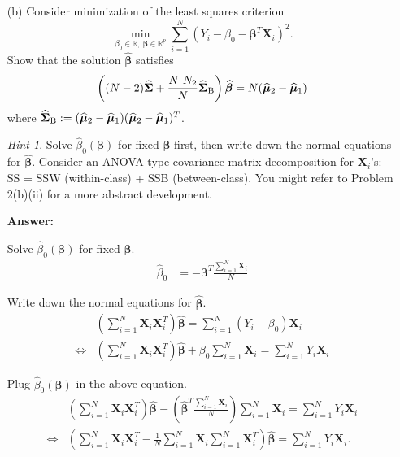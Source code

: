\documentclass[10pt]{article}
\theoremstyle{definition}
\theoremstyle{remark}
\newtheorem*{hint}{\underline{Hint}}
\newcommand{\bX}{\bm{X}}
\newcommand{\bbeta}{\bm{\beta}}
\newcommand{\bmu}{\bm{\mu}}
\newcommand{\bSigma}{\bm{\Sigma}}
\newcommand{\bbR}{\mathbb{R}}
\begin{document}
\begin{enumerate}
\begin{itemize}
		\item [(b)] Consider minimization of the least squares criterion
		\[ \min_{\beta_{0} \in \bbR,\ \bbeta \in \bbR^{p}}\sum_{i=1}^{N}(Y_{i} - \beta_{0} - \bbeta^{T}\bX_{i})^{2}. \]
		Show that the solution $ \widehat{\bbeta} $ satisfies
		\[ \left( (N-2)\widehat{\bSigma} + {N_{1}N_{2} \over N}\widehat{\bSigma}_{\rm B} \right)\widehat{\bbeta} = N(\widehat{\bmu}_{2} - \widehat{\bmu}_{1}) \]
		where $ \widehat{\bSigma}_{\rm B} := (\widehat{\bmu}_{2} - \widehat{\bmu}_{1})(\widehat{\bmu}_{2} - \widehat{\bmu}_{1})^{T} $.
		\begin{hint}
			Solve $ \widehat{\beta}_{0}(\bbeta) $ for fixed $ \bbeta $ first, then write down the normal equations for $ \widehat{\bbeta} $. Consider an ANOVA-type covariance matrix decomposition for $ \bX_{i} $'s: SS = SSW (within-class) + SSB (between-class). You might refer to Problem 2(b)(ii) for a more abstract development.
		\end{hint}
		
		\textbf{Answer:}
		
		Solve $ \widehat{\beta}_{0}(\bbeta) $ for fixed $ \bbeta $.
		\begin{align*}
		    \widehat{\beta}_{0} & = - \bbeta^T \frac{\sum_{i=1}^{N}\bX_{i}}{N}
		\end{align*}
		
		Write down the normal equations for $ \widehat{\bbeta} $.
		\begin{align*}
		    & \left( \sum_{i=1}^{N}\bX_i \bX_i^T \right) \widehat{\bbeta} = \sum_{i=1}^{N} (Y_i-\beta_0)\bX_i \\
		    \iff & \left(\sum_{i=1}^{N}\bX_i \bX_i^T \right) \widehat{\bbeta} + \beta_0 \sum_{i=1}^{N} \bX_i = \sum_{i=1}^{N} Y_i\bX_i
		\end{align*}
		
		Plug  $ \widehat{\beta}_{0}(\bbeta) $ in the above equation.
		\begin{align*}
		& \left(\sum_{i=1}^{N}\bX_i \bX_i^T \right) \widehat{\bbeta}  - \left(\widehat{\bbeta}^T \frac{\sum_{i=1}^{N}\bX_{i}}{N} \right) \sum_{i=1}^{N} \bX_i = \sum_{i=1}^{N} Y_i\bX_i \\
		\iff & \left(\sum_{i=1}^{N}\bX_i \bX_i^T - \frac{1}{N} \sum_{i=1}^{N}\bX_{i} \sum_{i=1}^{N}\bX_{i}^T \right) \widehat{\bbeta} = \sum_{i=1}^{N} Y_i\bX_i \tag{a1}.
		\end{align*}
		

\end{itemize}
\end{enumerate}
\end{document}
